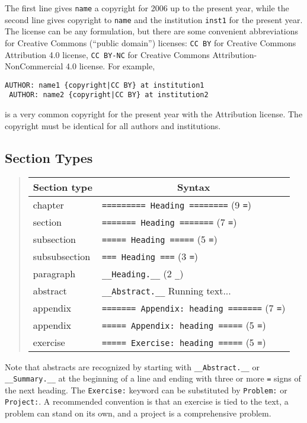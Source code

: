 \documentclass[%
oneside,                 %
final,                   %
10pt]{article}
\begin{document}
The first line gives \texttt{name} a copyright for 2006 up to the present year,
while the second line gives copyright to \texttt{name} and the institution \texttt{inst1}
for the present year. The license can be any formulation, but there are
some convenient abbreviations for Creative Commons (``public domain'')
licenses: \texttt{CC BY} for Creative Commons Attribution 4.0 license,
\texttt{CC BY-NC} for Creative Commons Attribution-NonCommercial 4.0 license.
For example,
\begin{Verbatim}[numbers=none,fontsize=\fontsize{9pt}{9pt},baselinestretch=0.95,xleftmargin=2mm]
 AUTHOR: name1 {copyright|CC BY} at institution1
 AUTHOR: name2 {copyright|CC BY} at institution2

\end{Verbatim}

is a very common copyright for the present year with the Attribution license.
The copyright must be identical for all authors and institutions.
\subsection{Section Types}
\label{quick:sections}
\begin{quote}
\begin{tabular}{ll}
\hline
\multicolumn{1}{c}{ Section type } & \multicolumn{1}{c}{ Syntax } \\
\hline
chapter       & \texttt{========= Heading ========} (9 \texttt{=})        \\
section       & \texttt{======= Heading =======}    (7 \texttt{=})        \\
subsection    & \texttt{===== Heading =====}        (5 \texttt{=})        \\
subsubsection & \texttt{=== Heading ===}            (3 \texttt{=})        \\
paragraph     & \Verb!__Heading.__!               (2 \Verb!_!)        \\
abstract      & \Verb!__Abstract.__! Running text...                  \\
appendix      & \texttt{======= Appendix: heading =======} (7 \texttt{=}) \\
appendix      & \texttt{===== Appendix: heading =====} (5 \texttt{=})     \\
exercise      & \texttt{===== Exercise: heading =====} (5 \texttt{=})     \\
\hline
\end{tabular}
\end{quote}
\noindent
Note that abstracts are recognized by starting with \Verb!__Abstract.__! or
\Verb!__Summary.__! at the beginning of a line and ending with three or
more \texttt{=} signs of the next heading.
The \texttt{Exercise:} keyword can be substituted by \texttt{Problem:} or \texttt{Project:}.
A recommended convention is that an exercise is tied to the text,
a problem can stand on its own, and a project is a comprehensive
problem.
\end{document}
